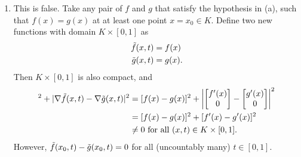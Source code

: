 \begin{problem}
\begin{solution}
\begin{enumerate}
    \item[(b)] This is false. Take any pair of $f$ and $g$ that satisfy the hypothesis in (a), such that $f(x) = g(x)$ at at least one point $x = x_0 \in K$. Define two new functions with domain $K \times [0,1]$ as
    \begin{align*}
        \Tilde{f}(x,t) &= f(x) \\
        \Tilde{g}(x,t) &= g(x).
    \end{align*}
    Then $K \times [0,1]$ is also compact, and
    \begin{align*}
        [\Tilde{f}(x,t) - \Tilde{g}(x,t)]^2 + |\nabla \Tilde{f}(x,t) - \nabla \Tilde{g}(x,t)|^2 &= [f(x) - g(x)]^2 + \abs{\begin{bmatrix}
           f'(x) \\
           0
         \end{bmatrix} - \begin{bmatrix} g'(x) \\
           0
         \end{bmatrix}}^2 \\
         &= [f(x) - g(x)]^2 + [f'(x) - g'(x)]^2 \\
         &\ne 0 \fall{(x,t)}{K \times [0,1]}.
    \end{align*}
    However, $\Tilde{f}(x_0,t) - \Tilde{g}(x_0,t) = 0$ for all (uncountably many) $t \in [0,1]$.
\end{enumerate}
\end{solution}
\end{problem}

